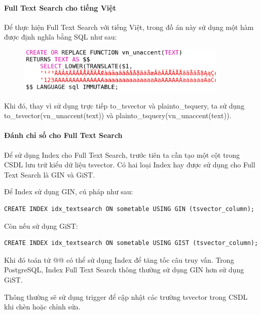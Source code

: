 \paragraph{Full Text Search cho tiếng Việt}
Để thực hiện Full Text Search với tiếng Việt,
trong đồ án này sử dụng một hàm được định nghĩa bằng SQL như sau: 
\begin{figure}[H]
\centering
\includegraphics[width=10cm]{images/unaccent.png}
\end{figure}
Khi đó, thay vì sử dụng trực tiếp to\_tsvector và plainto\_tsquery,
ta sử dụng \\
to\_tsvector(vn\_unaccent(text)) và plainto\_tsquery(vn\_unaccent(text)).

\paragraph{Đánh chỉ số cho Full Text Search}
Để sử dụng Index cho Full Text Search, trước tiên ta cần tạo
một cột trong CSDL lưu trữ kiểu dữ liệu tsvector.
Có hai loại Index hay được sử dụng cho Full Text Search là GIN và GiST. 

\noindent Để Index sử dụng GIN, cú pháp như sau:
\begin{lstlisting}[caption={Tạo index sử dụng GIN},captionpos=b]
CREATE INDEX idx_textsearch ON sometable USING GIN (tsvector_column);
\end{lstlisting}

\noindent Còn nếu sử dụng GiST:
\begin{lstlisting}[caption={Tạo index sử dụng GiST},captionpos=b]
CREATE INDEX idx_textsearch ON sometable USING GIST (tsvector_column);
\end{lstlisting}

Khi đó toán tử @@ có thể sử dụng Index để
tăng tốc câu truy vấn. Trong PostgreSQL, Index Full Text Search
thông thường sử dụng GIN hơn sử dụng GiST. 

Thông thường sẽ sử dụng trigger để cập nhật các trường
tsvector trong CSDL khi chèn hoặc chỉnh sửa.


